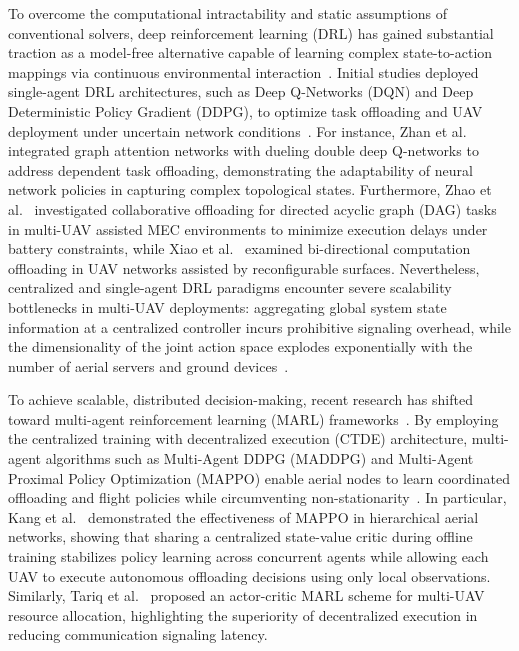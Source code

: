 \documentclass[journal]{IEEEtran}
\begin{document}
To overcome the computational intractability and static assumptions of conventional solvers, deep reinforcement learning (DRL) has gained substantial traction as a model-free alternative capable of learning complex state-to-action mappings via continuous environmental interaction~\cite{luong2019drl, mnih2015dqn}. Initial studies deployed single-agent DRL architectures, such as Deep Q-Networks (DQN) and Deep Deterministic Policy Gradient (DDPG), to optimize task offloading and UAV deployment under uncertain network conditions~\cite{yang2026drl, zhan2026joint}. For instance, Zhan et al.~\cite{zhan2026joint} integrated graph attention networks with dueling double deep Q-networks to address dependent task offloading, demonstrating the adaptability of neural network policies in capturing complex topological states. Furthermore, Zhao et al.~\cite{zhao2025dependency} investigated collaborative offloading for directed acyclic graph (DAG) tasks in multi-UAV assisted MEC environments to minimize execution delays under battery constraints, while Xiao et al.~\cite{xiao2024star} examined bi-directional computation offloading in UAV networks assisted by reconfigurable surfaces. Nevertheless, centralized and single-agent DRL paradigms encounter severe scalability bottlenecks in multi-UAV deployments: aggregating global system state information at a centralized controller incurs prohibitive signaling overhead, while the dimensionality of the joint action space explodes exponentially with the number of aerial servers and ground devices~\cite{tariq2024toward}.

To achieve scalable, distributed decision-making, recent research has shifted toward multi-agent reinforcement learning (MARL) frameworks~\cite{ddpg, yu2022mappo}. By employing the centralized training with decentralized execution (CTDE) architecture, multi-agent algorithms such as Multi-Agent DDPG (MADDPG) and Multi-Agent Proximal Policy Optimization (MAPPO) enable aerial nodes to learn coordinated offloading and flight policies while circumventing non-stationarity~\cite{kang2023cooperative, tariq2024toward}. In particular, Kang et al.~\cite{kang2023cooperative} demonstrated the effectiveness of MAPPO in hierarchical aerial networks, showing that sharing a centralized state-value critic during offline training stabilizes policy learning across concurrent agents while allowing each UAV to execute autonomous offloading decisions using only local observations. Similarly, Tariq et al.~\cite{tariq2024toward} proposed an actor-critic MARL scheme for multi-UAV resource allocation, highlighting the superiority of decentralized execution in reducing communication signaling latency.
\end{document}
